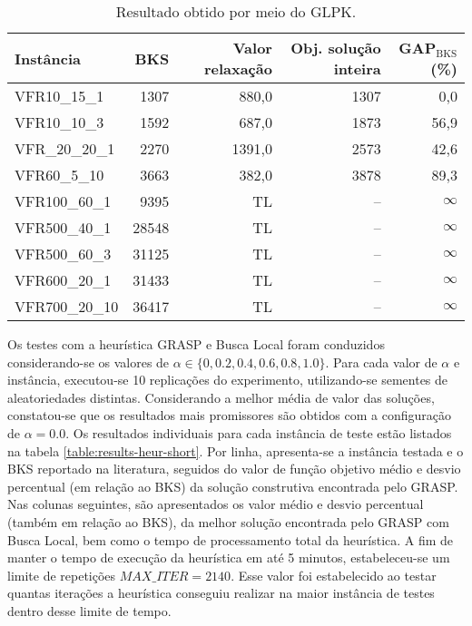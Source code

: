 \documentclass[12pt]{article}
\begin{document}
\begin{table}[ht]
   \centering
   \scriptsize
   \begin{tabular}{lrrrr}
      \toprule
      Instância & BKS & Valor relaxação & Obj. solução inteira & GAP$_\mathrm{BKS}$ (\%) \\
      \midrule
      VFR10\_15\_1 & 1307 & 880,0 & 1307 & \phantom{0}0,0\\
      VFR10\_10\_3 & 1592 & 687,0 & 1873 & 56,9\\
      VFR\_20\_20\_1 & 2270 & 1391,0 & 2573 & 42,6\\
      VFR60\_5\_10 & 3663 & 382,0 & 3878 & 89,3\\
      VFR100\_60\_1 & 9395  &  TL & -- & $\infty$\\
      VFR500\_40\_1 & 28548 &  TL & -- & $\infty$\\
      VFR500\_60\_3 & 31125 &  TL & -- & $\infty$\\
      VFR600\_20\_1 & 31433 &  TL & -- & $\infty$\\
      VFR700\_20\_10 & 36417 & TL & -- & $\infty$\\ 
      \bottomrule
   \end{tabular}
   \caption{Resultado obtido por meio do GLPK.}
   \label{table:results-glpk}
\end{table}

Os testes com a heurística GRASP e Busca Local foram conduzidos 
considerando-se os
valores de $\alpha \in \{0, 0.2, 0.4, 0.6, 0.8, 1.0\}$. Para cada valor de
$\alpha$ e instância, executou-se 10 replicações do experimento, 
utilizando-se sementes de aleatoriedades distintas. Considerando a melhor média
de valor das soluções, constatou-se que os resultados mais promissores são
obtidos com a configuração de $\alpha = 0.0$. Os resultados individuais para
cada instância de teste estão listados na tabela
\ref{table:results-heur-short}. Por linha, apresenta-se a instância testada e o
BKS reportado na literatura, seguidos do valor de função objetivo médio 
e desvio percentual (em relação ao BKS)
da solução construtiva encontrada pelo GRASP. Nas colunas seguintes, 
são apresentados os valor médio e desvio percentual (também em relação 
ao BKS), da melhor
solução encontrada pelo GRASP com Busca Local, bem como o tempo de
processamento total da heurística. A fim de manter o tempo
de execução da heurística em até 5 minutos, estabeleceu-se um limite de
repetições $\mathit{MAX\_ITER} = 2140$. Esse valor foi estabelecido ao testar
quantas iterações a heurística conseguiu realizar na maior instância de testes
dentro desse limite de tempo.
\end{document}
